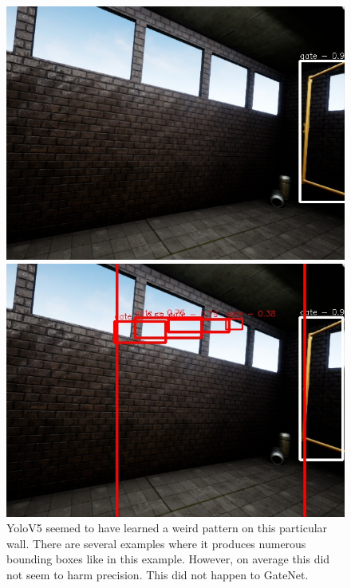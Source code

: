 \documentclass{article}
\begin{document}
\begin{figure}[h]
			\begin{minipage}{0.3\linewidth}
		\includegraphics[width=\linewidth]{fig/gate_comp5}
	\end{minipage}
	\begin{minipage}{0.3\linewidth}
		\includegraphics[width=\linewidth]{fig/v2_comp5}
	\end{minipage}
	\caption{YoloV5 seemed to have learned a weird pattern on this particular wall. There are several examples where it produces numerous bounding boxes like in this example. However, on average this did not seem to harm precision. This did not happen to GateNet.}
		\label{fig:examples}
\end{figure}
\end{document}
